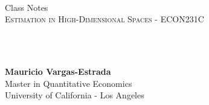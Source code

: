 {
	\parindent0pt
	\ \\ \ \\ \ \\

	\hrulefill
	\vspace{0.0cm}
	\begin{spacing}{1.1}
	{	
		\flushleft
		\fontsize{22pt}{44pt}\selectfont 
		Class Notes
	}\\
	\textsc{Estimation in High-Dimensional Spaces - ECON231C}
	\end{spacing}

	\ \\ \ \\
	{
		\textbf{Mauricio Vargas-Estrada}\\
		Master in Quantitative Economics\\
		University of California - Los Angeles\par
	}
	\ \\

	\hrulefill
}
